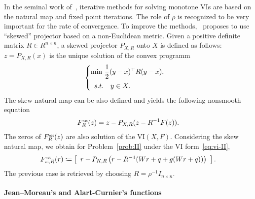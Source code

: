 {In the seminal work of~\cite{Sibony1970}, iterative methods for solving monotone VIs are based on the natural map and fixed point iterations. The role of $\rho$ is recognized to be very important for the rate of convergence. To improve the methods,~\citet{Sibony1970} proposes to use ``skewed'' projector based on a non-Euclidean metric. Given a positive definite matrix $R\in R^{n\times n}$, a skewed projector $P_{X,R}$ onto $X$ is defined as follows: $z  = P_{X,R}(x)$ is the unique solution of the convex programm
\begin{equation}
  \label{eq:opt-proj-skew}
  \begin{cases}
    \min\, \Frac 1 2 (y-x)^\top R (y-x), \\[2mm]
    \begin{array}{ll}
    s.t. & y \in X .
  \end{array}
  \end{cases}
\end{equation} 
The skew natural map can be also defined and yields the following nonsmooth equation
\begin{equation}
  \label{eq:skew-natural-NE}
   F_R^\nat(z) = z - P_{X,R}(z-R^{-1} F(z)).
\end{equation}
The zeros of $F_R^{\hbox{\sf \tiny{nat}}}(z)$ are also solution of the $\mathrm{VI}(X,F)$.
Considering the skew natural map, we obtain for Problem~\ref{prob:II} under the VI form~\eqref{eq:vi-II},
\begin{equation}
  \label{eq:natural-typeII}
  F_{\vitwo,R}^\nat(r) \coloneqq \left[
  \begin{array}{l} 
    r - P_{K,R}\left(r  - R^{-1} ( W r +q   + g(Wr+q))\right)  \end{array}\right].
\end{equation}
The previous case is retrieved by choosing $R = \rho^{-1} I_{n\times n}$.


\paragraph{Jean--Moreau's and Alart-Curnier's functions}

}
